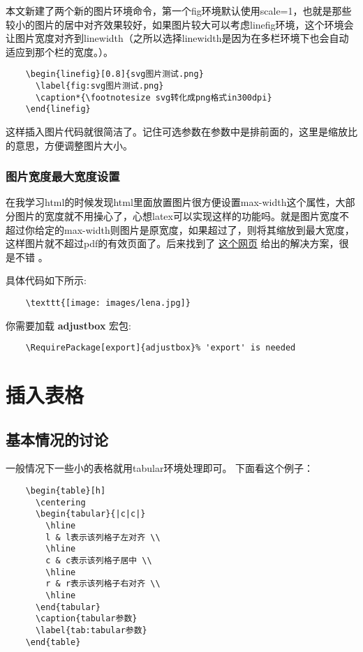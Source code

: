 \documentclass[11pt,oneside]{book}
\begin{document}
  本文新建了两个新的图片环境命令，第一个fig环境默认使用scale=1，也就是那些较小的图片的居中对齐效果较好，如果图片较大可以考虑linefig环境，这个环境会让图片宽度对齐到linewidth（之所以选择linewidth是因为在多栏环境下也会自动适应到那个栏的宽度。）。

  \begin{Verbatim}
    \begin{linefig}[0.8]{svg图片测试.png}
      \label{fig:svg图片测试.png}
      \caption*{\footnotesize svg转化成png格式in300dpi}
    \end{linefig}
  \end{Verbatim}
  这样插入图片代码就很简洁了。记住可选参数在参数中是排前面的，这里是缩放比的意思，方便调整图片大小。


  \subsection{图片宽度最大宽度设置}

  在我学习html的时候发现html里面放置图片很方便设置max-width这个属性，大部分图片的宽度就不用操心了，心想latex可以实现这样的功能吗。就是图片宽度不超过你给定的max-width则图片是原宽度，如果超过了，则将其缩放到最大宽度，这样图片就不超过pdf的有效页面了。后来找到了 \href{http://tex.stackexchange.com/questions/86350/includegraphics-maximum-width}{这个网页} 给出的解决方案，很是不错 。

  具体代码如下所示:
  \begin{Verbatim}
    \texttt{[image: images/lena.jpg]}
  \end{Verbatim}

  你需要加载 \textbf{adjustbox} 宏包:
  \begin{Verbatim}
    \RequirePackage[export]{adjustbox}% 'export' is needed
  \end{Verbatim}






  \chapter{插入表格}
  \section{基本情况的讨论}
  一般情况下一些小的表格就用tabular环境处理即可。
  下面看这个例子：
  \begin{Verbatim}
    \begin{table}[h]
      \centering
      \begin{tabular}{|c|c|}
        \hline
        l & l表示该列格子左对齐 \\
        \hline
        c & c表示该列格子居中 \\
        \hline
        r & r表示该列格子右对齐 \\
        \hline
      \end{tabular}
      \caption{tabular参数}
      \label{tab:tabular参数}
    \end{table}
  \end{Verbatim}
\end{document}
